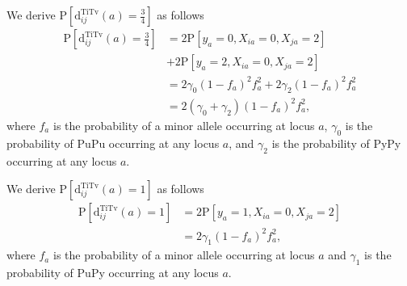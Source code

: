 \documentclass[aos]{imsart}
\begin{document}
We derive $\text{P}\left[\text{d}^\text{TiTv}_{ij}(a) = \frac{3}{4}\right]$ as follows
%
\begin{equation}\label{eq:prob_TiTv_0.75}
\begin{aligned}
\text{P}\left[\text{d}^\text{TiTv}_{ij}(a) = \frac{3}{4}\right] &= 2 \text{P}\left[y_a = 0, X_{ia} = 0, X_{ja} = 2\right] \\
&+ 2 \text{P}\left[y_a = 2, X_{ia} = 0, X_{ja} = 2\right] \\
&= 2 \gamma_0 (1 - f_a)^2 f^2_a + 2 \gamma_2 (1 - f_a)^2 f^2_a \\
&= 2(\gamma_0 + \gamma_2)(1 - f_a)^2 f^2_a,
\end{aligned}
\end{equation}
%
where $f_a$ is the probability of a minor allele occurring at locus $a$, $\gamma_0$ is the probability of PuPu occurring at any locus $a$, and $\gamma_2$ is the probability of PyPy occurring at any locus $a$.

We derive $\text{P}\left[\text{d}^\text{TiTv}_{ij}(a) = 1\right]$ as follows
%
\begin{equation}\label{eq:prob_TiTv_1}
\begin{aligned}
\text{P}\left[\text{d}^\text{TiTv}_{ij}(a) = 1\right] &= 2 \text{P}\left[y_a = 1, X_{ia} = 0, X_{ja} = 2\right] \\
&= 2 \gamma_1 (1 - f_a)^2 f^2_a,
\end{aligned}
\end{equation}
%
where $f_a$ is the probability of a minor allele occurring at locus $a$ and $\gamma_1$ is the probability of PuPy occurring at any locus $a$.
\end{document}
